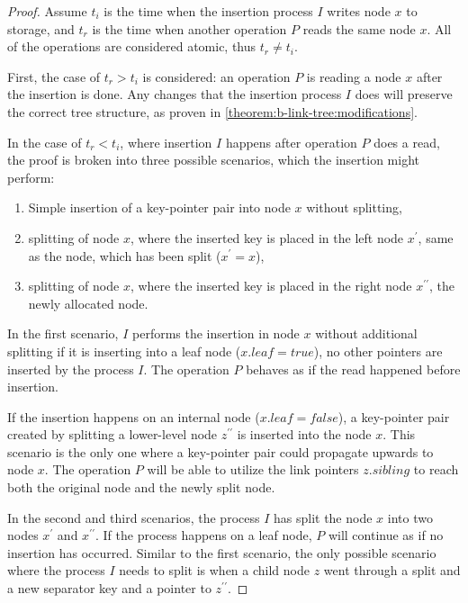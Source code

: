 \begin{proof}
  Assume $t_i$ is the time when the insertion process $I$ writes node $x$ to storage, and $t_r$ is the time when another operation $P$ reads the same node $x$. All of the operations are considered atomic, thus $t_r \neq t_i$.

  First, the case of $t_r > t_i$ is considered: an operation $P$ is reading a node $x$ after the insertion is done. Any changes that the insertion process $I$ does will preserve the correct tree structure, as proven in \cref{theorem:b-link-tree:modifications}.

  In the case of $t_r < t_i$, where insertion $I$ happens after operation $P$ does a read, the proof is broken into three possible scenarios, which the insertion might perform:

  \begin{enumerate}
    \item Simple insertion of a key-pointer pair into node $x$ without splitting,
    \item splitting of node $x$, where the inserted key is placed in the left node $x^\prime$, same as the node, which has been split ($x^\prime = x$),
    \item splitting of node $x$, where the inserted key is placed in the right node $x^{\prime\prime}$, the newly allocated node.
  \end{enumerate}

  In the first scenario, $I$ performs the insertion in node $x$ without additional splitting if it is inserting into a leaf node ($x.\mathit{leaf} = \mathit{true}$), no other pointers are inserted by the process $I$. The operation $P$ behaves as if the read happened before insertion.

  If the insertion happens on an internal node ($x.\mathit{leaf} = \mathit{false}$), a key-pointer pair created by splitting a lower-level node $z^{\prime\prime}$ is inserted into the node $x$. This scenario is the only one where a key-pointer pair could propagate upwards to node $x$. The operation $P$ will be able to utilize the link pointers $z.\mathit{sibling}$ to reach both the original node and the newly split node.

  In the second and third scenarios, the process $I$ has split the node $x$ into two nodes $x^\prime$ and $x^{\prime\prime}$. If the process happens on a leaf node, $P$ will continue as if no insertion has occurred. Similar to the first scenario, the only possible scenario where the process $I$ needs to split is when a child node $z$ went through a split and a new separator key and a pointer to $z^{\prime\prime}$.


\end{proof}
